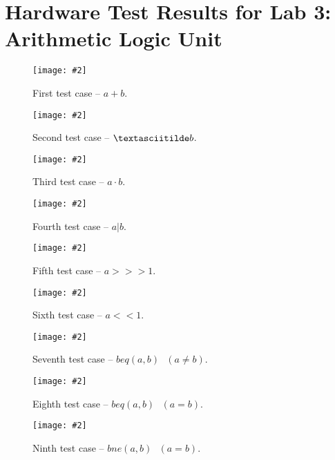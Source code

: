 \documentclass[12pt, letterpaper]{article}
\newcommand{\InsertImage}[3][\linewidth]{
	\begin{figure}[h]
		\centering
		\texttt{[image: \#2]}
		\caption{#3}
	\end{figure}
}
\begin{document}
\newpage
\section{Hardware Test Results for Lab 3: Arithmetic Logic Unit}
\FloatBarrier
\InsertImage[0.9\linewidth]{images/hardware/lab3/case-0.png}{First test case   -- $a + b$.}
\InsertImage[0.9\linewidth]{images/hardware/lab3/case-1.png}{Second test case  -- $\textasciitilde b$.}
\InsertImage[0.9\linewidth]{images/hardware/lab3/case-2.png}{Third test case   -- $a \cdot b$.}
\InsertImage[0.9\linewidth]{images/hardware/lab3/case-3.png}{Fourth test case  -- $a | b$.}
\InsertImage[0.9\linewidth]{images/hardware/lab3/case-4.png}{Fifth test case   -- $a >>> 1$.}
\InsertImage[0.9\linewidth]{images/hardware/lab3/case-5.png}{Sixth test case   -- $a << 1$.}
\InsertImage[0.9\linewidth]{images/hardware/lab3/case-6.png}{Seventh test case -- $beq(a, b)~~~(a \neq b)$.}
\InsertImage[0.9\linewidth]{images/hardware/lab3/case-7.png}{Eighth test case  -- $beq(a, b)~~~(a = b)$.}
\InsertImage[0.9\linewidth]{images/hardware/lab3/case-8.png}{Ninth test case   -- $bne(a, b)~~~(a = b)$.}
\FloatBarrier
\end{document}
